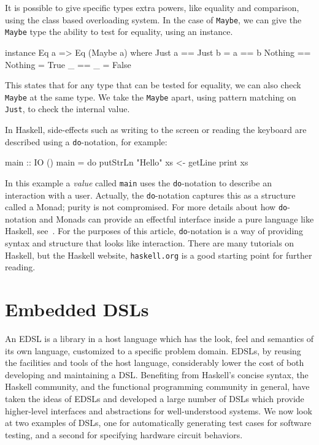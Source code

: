 \documentclass[11pt]{article}
\begin{document}
It is possible to give specific types extra powers, like equality and comparison,
using the class based overloading system. In the case of \verb|Maybe|, we
can give the \verb|Maybe| type the ability to test for equality, using an
instance.
\begin{Code}
instance Eq a => Eq (Maybe a) where        
  Just a  == Just b  = a == b
  Nothing == Nothing = True
  _       == _       = False
\end{Code}

This states that for any type that can be tested for equality,
we can also check \verb|Maybe| at the same type. We take the \verb|Maybe|
apart, using pattern matching on \verb|Just|, to check the internal value.

In Haskell, side-effects such as writing to the screen
or reading the keyboard are described using a \verb|do|-notation, for example:

\begin{Code}

main :: IO ()
main = do
  putStrLn "Hello"
  xs <- getLine
  print xs

\end{Code}

In this example a {\em value\/} called \verb|main| uses the \verb|do|-notation to describe
an interaction with a user. Actually, the \verb|do|-notation captures
this as a structure called a Monad; purity is not compromised. For more details
about how \verb|do|-notation and Monads can provide an effectful interface
inside a pure language like Haskell, see~\cite{SPJ:93:IFP}. For the
purposes of this article, \verb|do|-notation is a way of providing syntax
and structure that looks like interaction. There are many tutorials
on Haskell, but the Haskell website, \verb|haskell.org| is a good starting point
for further reading.

\section{Embedded DSLs}

An EDSL is a library in a host language which has the look, feel and semantics of its own language,
customized to a specific problem domain.
EDSLs, by reusing the facilities and tools of the host language, considerably lower the cost of both
developing and maintaining a DSL.
Benefiting from Haskell's concise syntax, the Haskell community, and the functional programming
community in general, have taken the ideas
of EDSLs and developed a large number of DSLs
which provide higher-level interfaces and abstractions for well-understood systems.
We now look at two examples of DSLs, one for automatically generating test cases for software testing,
and a second for specifying hardware circuit behaviors.
\end{document}
